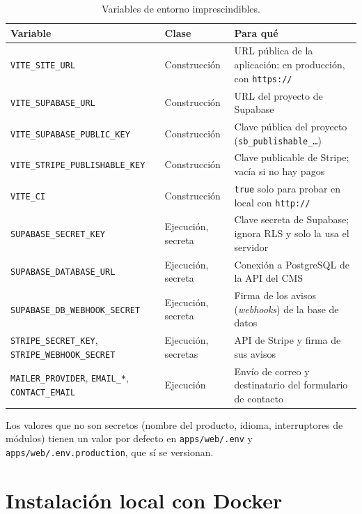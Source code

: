 \begin{table}[htbp]
  \centering
  \footnotesize
  \caption{Variables de entorno imprescindibles.}
  \label{tab:ig-variables}
  \begin{tabularx}{\textwidth}{@{}>{\raggedright\arraybackslash}p{5.0cm}>{\raggedright\arraybackslash}p{2.0cm}X@{}}
    \toprule
    \textbf{Variable} & \textbf{Clase} & \textbf{Para qué} \\
    \midrule
    \texttt{VITE\_SITE\_URL} & Construcción & URL pública de la aplicación; en producción, con \texttt{https://} \\
    \texttt{VITE\_SUPABASE\_URL} & Construcción & URL del proyecto de Supabase \\
    \texttt{VITE\_SUPABASE\_PUBLIC\_KEY} & Construcción & Clave pública del proyecto (\texttt{sb\_publishable\_\ldots}) \\
    \texttt{VITE\_STRIPE\_PUBLISHABLE\_KEY} & Construcción & Clave publicable de Stripe; vacía si no hay pagos \\
    \texttt{VITE\_CI} & Construcción & \texttt{true} solo para probar en local con \texttt{http://} \\
    \texttt{SUPABASE\_SECRET\_KEY} & Ejecución, secreta & Clave secreta de Supabase; ignora RLS y solo la usa el servidor \\
    \texttt{SUPABASE\_DATABASE\_URL} & Ejecución, secreta & Conexión a PostgreSQL de la API del CMS \\
    \texttt{SUPABASE\_DB\_WEBHOOK\_SECRET} & Ejecución, secreta & Firma de los avisos (\textit{webhooks}) de la base de datos \\
    \texttt{STRIPE\_SECRET\_KEY}, \texttt{STRIPE\_WEBHOOK\_SECRET} & Ejecución, secretas & API de Stripe y firma de sus avisos \\
    \texttt{MAILER\_PROVIDER}, \texttt{EMAIL\_*}, \texttt{CONTACT\_EMAIL} & Ejecución & Envío de correo y destinatario del formulario de contacto \\
    \bottomrule
  \end{tabularx}
\end{table}

Los valores que no son secretos (nombre del producto, idioma, interruptores de
módulos) tienen un valor por defecto en \texttt{apps/web/.env} y
\texttt{apps/web/.env.production}, que sí se versionan.

\section{Instalación local con Docker}
\label{sec:ig-local}

